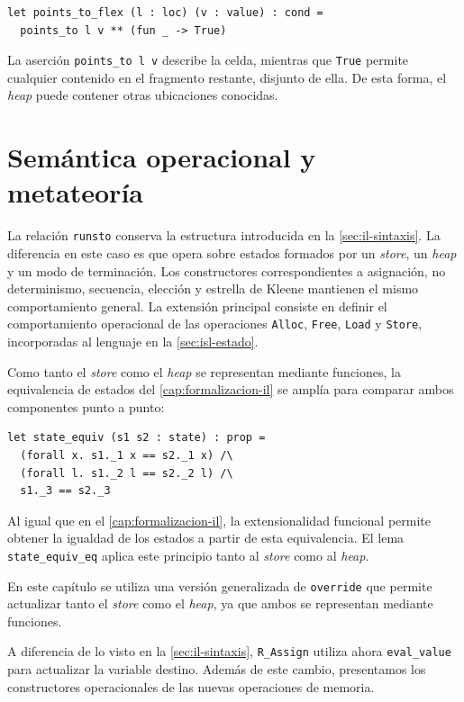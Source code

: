\documentclass[a4paper,	11pt]{report}
\begin{document}
\begin{lstlisting}
let points_to_flex (l : loc) (v : value) : cond =
  points_to l v ** (fun _ -> True)
\end{lstlisting}
La aserción \lstinline|points_to l v| describe la celda,
mientras que \lstinline|True| permite cualquier contenido en el fragmento restante,
disjunto de ella.
De esta forma,
el \emph{heap} puede contener otras ubicaciones conocidas.

\section{Semántica operacional y metateoría}
\label{sec:isl-semantica}
La relación \texttt{runsto} conserva la estructura introducida en la \autoref{sec:il-sintaxis}.
La diferencia en este caso es que opera sobre estados formados por un \emph{store},
un \emph{heap} y un modo de terminación.
Los constructores correspondientes a asignación,
no determinismo, secuencia, elección y estrella de Kleene mantienen el mismo comportamiento general.
La extensión principal consiste en definir el comportamiento operacional de las operaciones \lstinline|Alloc|,
\lstinline|Free|, \lstinline|Load| y \lstinline|Store|,
incorporadas al lenguaje en la \autoref{sec:isl-estado}.

Como tanto el \emph{store} como el \emph{heap} se representan mediante funciones,
la equivalencia de estados del \autoref{cap:formalizacion-il} se amplía para comparar ambos componentes punto a punto:

\begin{lstlisting}
let state_equiv (s1 s2 : state) : prop =
  (forall x. s1._1 x == s2._1 x) /\
  (forall l. s1._2 l == s2._2 l) /\
  s1._3 == s2._3
\end{lstlisting}
Al igual que en el \autoref{cap:formalizacion-il},
la extensionalidad funcional permite obtener la igualdad de los estados a partir de esta equivalencia.
El lema \lstinline|state_equiv_eq| aplica este principio tanto al \emph{store} como al \emph{heap}.

En este capítulo se utiliza una versión generalizada de \lstinline|override| que permite actualizar tanto el \emph{store} como el \emph{heap},
ya que ambos se representan mediante funciones.

A diferencia de lo visto en la \autoref{sec:il-sintaxis},
\lstinline|R_Assign| utiliza ahora \lstinline|eval_value| para actualizar la variable destino.
Además de este cambio,
presentamos los constructores operacionales de las nuevas operaciones de memoria.
\end{document}
